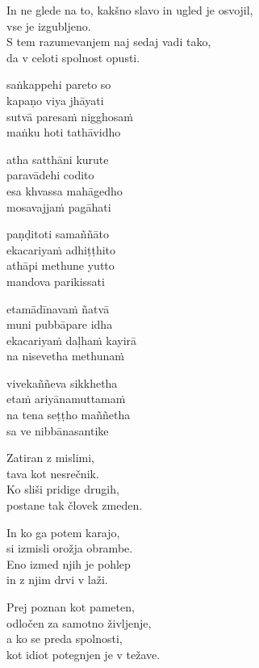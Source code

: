 In ne glede na to, kakšno slavo in ugled je osvojil,\\
vse je izgubljeno.\\
S tem razumevanjem naj sedaj vadi tako,\\
da v celoti spolnost opusti.


\clearpage

saṅkappehi pareto so\\
kapaṇo viya jhāyati\\
sutvā paresaṁ nigghosaṁ\\
maṅku hoti tathāvidho

atha satthāni kurute\\
paravādehi codito\\
esa khvassa mahāgedho\\
mosavajjaṁ pagāhati

paṇḍitoti samaññāto\\
ekacariyaṁ adhiṭṭhito\\
athāpi methune yutto\\
mandova parikissati

etamādīnavaṁ ñatvā\\
muni pubbāpare idha\\
ekacariyaṁ daḷhaṁ kayirā\\
na nisevetha methunaṁ

vivekaññeva sikkhetha\\
etaṁ ariyānamuttamaṁ\\
na tena seṭṭho maññetha\\
sa ve nibbānasantike


\clearpage

Zatiran z mislimi,\\
tava kot nesrečnik.\\
Ko sliši pridige drugih,\\
postane tak človek zmeden.

In ko ga potem karajo,\\
si izmisli orožja obrambe.\\
Eno izmed njih je pohlep\\
in z njim drvi v laži.

Prej poznan kot pameten,\\
odločen za samotno življenje,\\
a ko se preda spolnosti,\\
kot idiot potegnjen je v težave.

